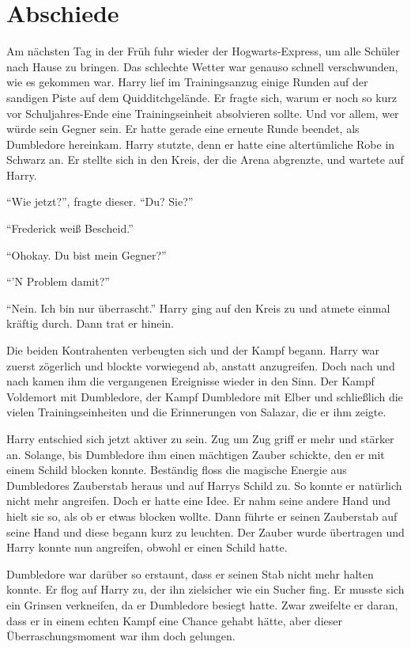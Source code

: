 \chapter{Abschiede}


Am nächsten Tag in der Früh fuhr wieder der Hogwarts-Express, um alle Schüler nach Hause zu bringen. Das schlechte Wetter war genauso schnell verschwunden, wie es gekommen war. Harry lief im Trainingsanzug einige Runden auf der sandigen Piste auf dem Quidditchgelände. Er fragte sich, warum er noch so kurz vor Schuljahres-Ende eine Trainingseinheit absolvieren sollte. Und vor allem, wer würde sein Gegner sein. Er hatte gerade eine erneute Runde beendet, als Dumbledore hereinkam. Harry stutzte, denn er hatte eine altertümliche Robe in Schwarz an. Er stellte sich in den Kreis, der die Arena abgrenzte, und wartete auf Harry.

\enquote{Wie jetzt?}, fragte dieser. \enquote{Du? \gst Sie?}

\enquote{Frederick weiß Bescheid.}

\enquote{Oh\abs okay. Du bist mein Gegner?}

\enquote{’N Problem damit?}

\enquote{Nein. Ich bin nur überrascht.} Harry ging auf den Kreis zu und atmete einmal kräftig durch. Dann trat er hinein.

Die beiden Kontrahenten verbeugten sich und der Kampf begann. Harry war zuerst zögerlich und blockte vorwiegend ab, anstatt anzugreifen. Doch nach und nach kamen ihm die vergangenen Ereignisse wieder in den Sinn. Der Kampf Voldemort mit Dumbledore, der Kampf Dumbledore mit Elber und schließlich die vielen Trainingseinheiten und die Erinnerungen von Salazar, die er ihm zeigte.

Harry entschied sich jetzt aktiver zu sein. Zug um Zug griff er mehr und stärker an. Solange, bis Dumbledore ihm einen mächtigen Zauber schickte, den er mit einem Schild blocken konnte. Beständig floss die magische Energie aus Dumbledores Zauberstab heraus und auf Harrys Schild zu. So konnte er natürlich nicht mehr angreifen. Doch er hatte eine Idee. Er nahm seine andere Hand und hielt sie so, als ob er etwas blocken wollte. Dann führte er seinen Zauberstab auf seine Hand und diese begann kurz zu leuchten. Der Zauber wurde übertragen und Harry konnte nun angreifen, obwohl er einen Schild hatte.

Dumbledore war darüber so erstaunt, dass er seinen Stab nicht mehr halten konnte. Er flog auf Harry zu, der ihn zielsicher wie ein Sucher fing. Er musste sich ein Grinsen verkneifen, da er Dumbledore besiegt hatte. Zwar zweifelte er daran, dass er in einem echten Kampf eine Chance gehabt hätte, aber dieser Überraschungsmoment war ihm doch gelungen.

